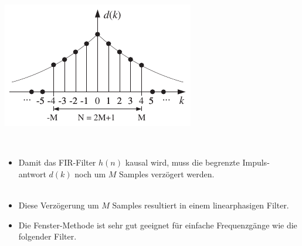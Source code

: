 \begin{minipage}{0.28\textwidth}
	\includegraphics[width = \textwidth]{pic/FensterFIRFilter.pdf}\\[2.7cm]
\end{minipage}\\[-1.8cm]
\begin{itemize}
 \item Damit das FIR-Filter $h(n)$ kausal wird, muss die begrenzte Impuls-\\antwort $d(k)$ noch um $M$ Samples verzögert werden.\\[0.2cm]
 \\[-0.25cm]
 \item Diese Verzögerung um $M$ Samples resultiert in einem linearphasigen Filter.
 \item Die Fenster-Methode ist sehr gut geeignet für einfache Frequenzgänge wie die folgender Filter.\\
\end{itemize}

